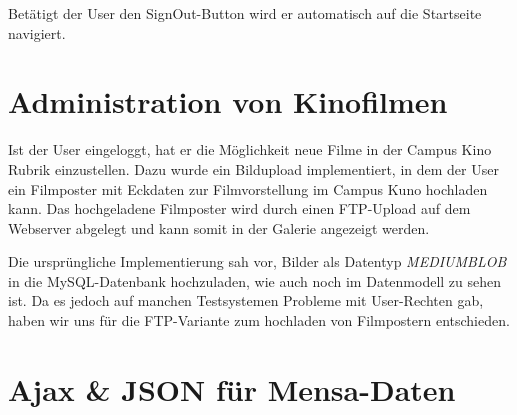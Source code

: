 Betätigt der User den SignOut-Button wird er automatisch auf die Startseite navigiert.

\chapter{Administration von Kinofilmen}
Ist der User eingeloggt, hat er die Möglichkeit neue Filme in der Campus Kino Rubrik einzustellen. Dazu wurde ein Bildupload implementiert, in dem der User ein Filmposter mit Eckdaten zur Filmvorstellung im Campus Kuno hochladen kann. Das hochgeladene Filmposter wird durch einen FTP-Upload auf dem Webserver abgelegt und kann somit in der Galerie angezeigt werden.

Die ursprüngliche Implementierung sah vor, Bilder als Datentyp \textit{MEDIUMBLOB} in die MySQL-Datenbank hochzuladen, wie auch noch im Datenmodell zu sehen ist. Da es jedoch auf manchen Testsystemen Probleme mit User-Rechten gab, haben wir uns für die FTP-Variante zum hochladen von Filmpostern entschieden.

\chapter{Ajax \& JSON für Mensa-Daten}